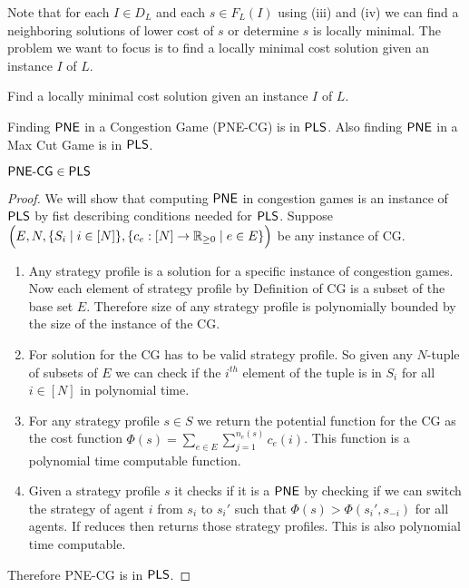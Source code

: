 Note that for each $I\in D_L$ and each $s\in F_L(I)$ using (iii) and (iv) we can find a neighboring solutions of lower cost of $s$ or determine $s$ is locally minimal. The problem we want to focus is to find a locally minimal cost solution given an instance $I$ of $L$.

\begin{goal}
	Find a locally minimal cost solution given an instance $I$ of $L$.
\end{goal}
Finding $\operatorname{\mathsf{PNE}}$ in a Congestion Game (\textsf{PNE-CG}) is in $\operatorname{\mathsf{PLS}}$. Also finding $\operatorname{\mathsf{PNE}} $  in a Max Cut Game is in $\operatorname{\mathsf{PLS}}$.
\begin{lemma}{}{}
	$\textsf{PNE-CG}\in \operatorname{\mathsf{PLS}}$
\end{lemma}
\begin{proof}
	We will show that computing $\operatorname{\mathsf{PNE}}$ in congestion games is an instance of $\operatorname{\mathsf{PLS}}$ by fist describing conditions needed for $\operatorname{\mathsf{PLS}}$. Suppose $\Big(E,N, \{S_i\mid i\in[N]\}, \{c_e:[N]\to \mathbb{R}_{\geq 0}\mid e\in E\}\Big)$ be any instance of CG.
	\begin{enumerate}[label=(\roman*)]
		\item Any strategy profile is a solution for a specific instance of congestion games. Now each element of strategy profile by Definition of CG is a subset of the base set $E$. Therefore size of any strategy profile is polynomially bounded by the size of the instance of the CG.
		\item For solution for the CG has to be valid strategy profile. So given any $N$-tuple of subsets of $E$ we can check if the $i^{th}$ element of the tuple is in $S_i$ for all $i\in[N]$ in polynomial time.
		\item For any strategy profile $s\in S$ we return the potential function for the CG as the cost function $\Phi(s)=\sum\limits_{e\in E}\sum\limits_{j=1}^{n_e(s)}c_e(i)$. This function is a polynomial time computable function.
		\item Given a strategy profile $s$ it checks if it is a $\operatorname{\mathsf{PNE}}$ by checking if we can switch the strategy of agent $i$ from $s_i$ to $s_i'$ such that $\Phi(s)>\Phi(s_i',s_{-i})$ for all agents.  If reduces then returns those strategy profiles. This is also polynomial time computable.
	\end{enumerate}
Therefore \textsf{PNE-CG} is in $\operatorname{\mathsf{PLS}}$.
\end{proof}
